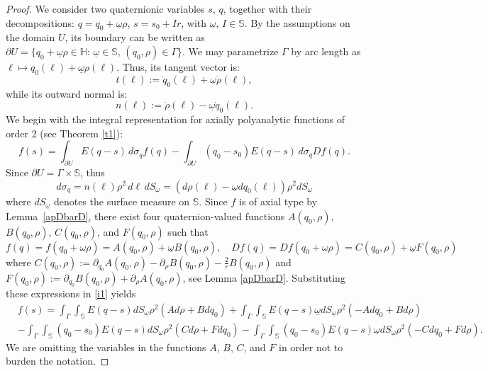 \documentclass[reqno,11pt]{amsart}
\numberwithin{equation}{section}
\theoremstyle{definition}
\begin{document}
\begin{proof}
	
	
	
	 We consider two quaternionic variables $s,\,q$, together with their decompositions: $q=q_0+\underline{\omega} \rho$, $s=s_0+Ir$, with $\underline{\omega},\, I\in\mathbb S$. By the assumptions on the domain $U$, its boundary can be written as $\partial U=\{q_0+\underline{\omega}\rho\in \mathbb H:\, \underline{\omega}\in\mathbb S, \, (q_0,\rho) \in\Gamma \}$. We may parametrize $\Gamma$ by arc length as $\ell\mapsto q_0(\ell)+\underline{\omega}\rho(\ell)$. Thus, its tangent vector is:
	$$t(\ell):=\dot{q}_0(\ell)+\underline{\omega} \dot{\rho}(\ell),$$
	while its outward normal is:
	$$n(\ell):=\dot \rho(\ell)-\underline{\omega} \dot{q}_0(\ell).$$
	We begin with the integral representation for axially polyanalytic functions of order 2 (see Theorem \ref{t1}):
	\begin{equation}\label{i1}
		f(s)=\int_{\partial U} E(q-s) \, d\sigma_q f(q)- \int_{\partial U} (q_0-s_0)E(q-s) \, d\sigma_q D f(q).
	\end{equation}
	Since $\partial U=\Gamma\times \mathbb S$, thus
	$$ d\sigma_q=n(\ell)\rho^2\, d\ell\, dS_{\underline{\omega}}=(d\rho(\ell)-\underline{\omega} dq_0(\ell))\rho^2 dS_{\underline{\omega}} $$
	where $dS_{\underline{\omega}}$ denotes the surface measure on $\mathbb S$. Since $f$ is of axial type by Lemma~\ref{apDbarD}, there exist four quaternion-valued functions $A(q_0,\rho)$, $B(q_0,\rho)$, $C(q_0,\rho)$, and $F(q_0,\rho)$ such that
	$$ f(q)=f(q_0+\omega\rho)=A(q_0,\rho)+\underline{\omega} B(q_0,\rho),\quad Df(q)=Df(q_0+\omega\rho)=C(q_0,\rho)+\underline{\omega}  F(q_0,\rho) $$
	where $C(q_0,\rho):=\partial_{q_0} A(q_0,\rho)-\partial_\rho B(q_0,\rho)-\frac 2r B(q_0,\rho)$ and $F(q_0,\rho):=\partial_{q_0}B(q_0,\rho)+\partial_\rho A(q_0,\rho)$, see Lemma \ref{apDbarD}. Substituting these expressions in \eqref{i1} yields
	\begin{align}\label{e2}
		& f(s)  =\int_{\Gamma}\int_{\mathbb S} E(q-s) dS_{\underline{\omega}}\rho^2(Ad\rho +Bdq_0) +\int_{\Gamma}\int_{\mathbb S} E(q-s)  \underline{\omega} dS_{\underline{\omega}}\rho^2(-Adq_0 +Bd\rho)\\
		&-\int_{\Gamma}\int_{\mathbb S} (q_0-s_0)E(q-s) dS_{\underline{\omega}}\rho^2(Cd\rho +Fdq_0)-\int_{\Gamma}\int_{\mathbb S} (q_0-s_0) E(q-s)  \underline{\omega} dS_{\underline{\omega}}\rho^2 (-Cdq_0 +Fd\rho).\nonumber
	\end{align}
We are omitting the variables in the functions $A$, $B$, $C$, and $F$ in order not to burden the notation.

\end{proof}
\end{document}
